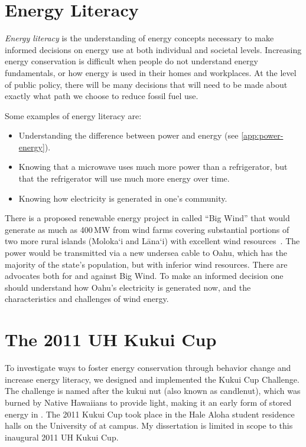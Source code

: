 \section{Energy Literacy}

\emph{Energy literacy} is the understanding of energy concepts necessary to make informed decisions on energy use at both individual and societal levels. Increasing energy conservation is difficult when people do not understand energy fundamentals, or how energy is used in their homes and workplaces. At the level of public policy, there will be many decisions that will need to be made about exactly what path we choose to reduce fossil fuel use.

Some examples of energy literacy are:

\begin{itemize}
	\item Understanding the difference between power and energy (see \autoref{app:power-energy}).
	\item Knowing that a microwave uses much more power than a refrigerator, but that the refrigerator will use much more energy over time.
	\item Knowing how electricity is generated in one's community.
\end{itemize}

There is a proposed renewable energy project in \Hawaii called ``Big Wind'' that would generate as much as 400\,MW from wind farms covering substantial portions of two more rural islands (Moloka`i and L\=ana`i) with excellent wind resources~\cite{big-wind}. The power would be transmitted via a new undersea cable to Oahu, which has the majority of the state's population, but with inferior wind resources. There are advocates both for and against Big Wind. To make an informed decision one should understand how Oahu's electricity is generated now, and the characteristics and challenges of wind energy.


\section{The 2011 UH Kukui Cup}

To investigate ways to foster energy conservation through behavior change and increase energy literacy, we designed and implemented the Kukui Cup Challenge. The challenge is named after the kukui nut (also known as candlenut), which was burned by Native Hawaiians to provide light, making it an early form of stored energy in \Hawaii. The 2011 Kukui Cup took place in the Hale Aloha student residence halls on the University of \Hawaii at \Manoa campus. My dissertation is limited in scope to this inaugural 2011 UH Kukui Cup.

